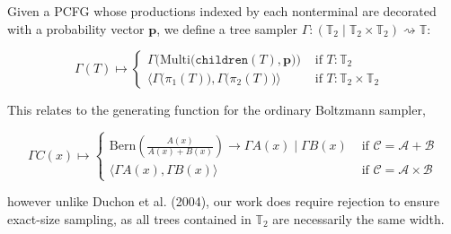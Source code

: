 \documentclass[portrait,a0b,final,a4resizeable]{a0poster}
\def\jointspacing{\vspace{0.3in}}
\begin{document}
\begin{poster}
\begin{multicols}{2}

      \jointspacing

      \hspace*{2cm}\begin{minipage}[c]{0.90\columnwidth}
      Given a PCFG whose productions indexed by each nonterminal are decorated with a probability vector $\mathbf{p}$, we define a tree sampler $\Gamma: (\mathbb{T}_2 \mid \mathbb{T}_2\times\mathbb{T}_2) \rightsquigarrow \mathbb{T}$:
      \end{minipage}

      \begin{equation*}
        \Gamma(T) \mapsto \begin{cases}
          \Gamma\Big(\text{Multi} \big(\texttt{children}(T), \mathbf{p}\big)\Big) & \text{ if $T: \mathbb{T}_2$ } \\
          \Big\langle \Gamma\big(\pi_1(T)\big), \Gamma\big(\pi_2(T)\big) \Big\rangle & \text{ if $T: \mathbb{T}_2\times \mathbb{T}_2$ }
        \end{cases}
      \end{equation*}


      \hspace*{2cm}\begin{minipage}[c]{0.90\columnwidth}
      This relates to the generating function for the ordinary Boltzmann sampler,
      \end{minipage}

      \begin{equation*}
        \Gamma C(x) \mapsto \begin{cases}
                              \text{Bern} \left(\frac{A(x)}{A(x) + B(x)}\right) \rightarrow \Gamma A(x) \mid \Gamma B(x) & \text{ if } \mathcal{C}=\mathcal{A}+\mathcal{B} \\
                              \big\langle \Gamma A(x), \Gamma B(x)\big\rangle & \text{ if } \mathcal{C}=\mathcal{A} \times \mathcal{B}
        \end{cases}
      \end{equation*}


      \hspace*{2cm}\begin{minipage}[c]{0.90\columnwidth}
      however unlike Duchon et al. (2004), our work does require rejection to ensure exact-size sampling, as all trees contained in $\mathbb{T}_2$ are necessarily the same width.
      \end{minipage}


\end{multicols}
\end{poster}
\end{document}
